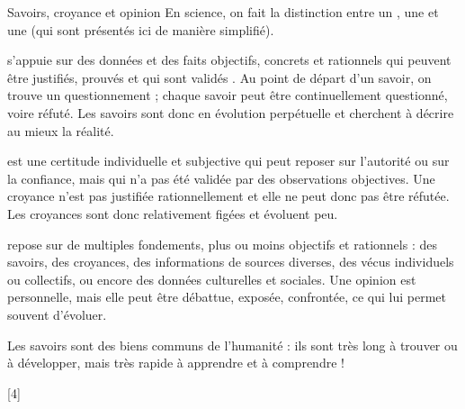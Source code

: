 \teteSndAP
{}


\begin{doc}{Savoirs, croyance et opinion}
  En science, on fait la distinction entre un , une  et une  (qui sont présentés ici de manière simplifié).

  \begin{listePoints}
    \item
     s'appuie sur des données et des faits objectifs, concrets et rationnels qui peuvent être justifiés, prouvés et qui sont validés .
    Au point de départ d'un savoir, on trouve un questionnement ; chaque savoir peut être continuellement questionné, voire réfuté.
    Les savoirs sont donc en évolution perpétuelle et cherchent à décrire au mieux la réalité.
 
    \item 
     est une certitude individuelle et subjective qui peut reposer sur l'autorité ou sur la confiance, mais qui n'a pas été validée par des observations objectives.
    Une croyance n'est pas justifiée rationnellement et elle ne peut donc pas être réfutée.
    Les croyances sont donc relativement figées et évoluent peu.
  
    \item
     repose sur de multiples fondements, plus ou moins objectifs et rationnels : des savoirs, des croyances, des informations de sources diverses, des vécus individuels ou collectifs, ou encore des données culturelles et sociales.
    Une opinion est personnelle, mais elle peut être débattue, exposée, confrontée, ce qui lui permet souvent d'évoluer.
  \end{listePoints}

  Les savoirs sont des biens communs de l'humanité : ils sont très long à trouver ou à développer, mais très rapide à apprendre et à comprendre !
\end{doc}

[4]


